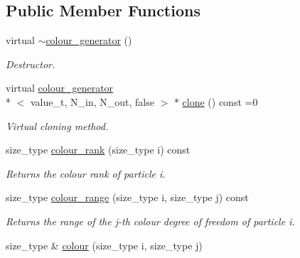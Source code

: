 \subsection*{Public Member Functions}
\begin{DoxyCompactItemize}
\item 
\hypertarget{a00083_a1044bee0f0a9c0fadf153f4c9581c8b9}{virtual \hyperlink{a00083_a1044bee0f0a9c0fadf153f4c9581c8b9}{$\sim$colour\-\_\-generator} ()}\label{a00083_a1044bee0f0a9c0fadf153f4c9581c8b9}

\begin{DoxyCompactList}\small\item\em Destructor. \end{DoxyCompactList}\item 
\hypertarget{a00083_af8ab8562a2d5f575ab2d78c8f5a147cc}{virtual \hyperlink{a00082}{colour\-\_\-generator}\\*
$<$ value\-\_\-t, N\-\_\-in, N\-\_\-out, false $>$ $\ast$ \hyperlink{a00083_af8ab8562a2d5f575ab2d78c8f5a147cc}{clone} () const =0}\label{a00083_af8ab8562a2d5f575ab2d78c8f5a147cc}

\begin{DoxyCompactList}\small\item\em Virtual cloning method. \end{DoxyCompactList}\item 
\hypertarget{a00083_ad98bfdc531f942c45685dc997d058022}{size\-\_\-type \hyperlink{a00083_ad98bfdc531f942c45685dc997d058022}{colour\-\_\-rank} (size\-\_\-type i) const }\label{a00083_ad98bfdc531f942c45685dc997d058022}

\begin{DoxyCompactList}\small\item\em Returns the colour rank of particle i. \end{DoxyCompactList}\item 
\hypertarget{a00083_ad7bd3090484c7046ebf5ae7d2abb60c8}{size\-\_\-type \hyperlink{a00083_ad7bd3090484c7046ebf5ae7d2abb60c8}{colour\-\_\-range} (size\-\_\-type i, size\-\_\-type j) const }\label{a00083_ad7bd3090484c7046ebf5ae7d2abb60c8}

\begin{DoxyCompactList}\small\item\em Returns the range of the j-\/th colour degree of freedom of particle i. \end{DoxyCompactList}\item 
\hypertarget{a00083_aa52bb677a682b0c054c576e261a0f19e}{size\-\_\-type \& \hyperlink{a00083_aa52bb677a682b0c054c576e261a0f19e}{colour} (size\-\_\-type i, size\-\_\-type j)}\label{a00083_aa52bb677a682b0c054c576e261a0f19e}


\end{DoxyCompactItemize}
